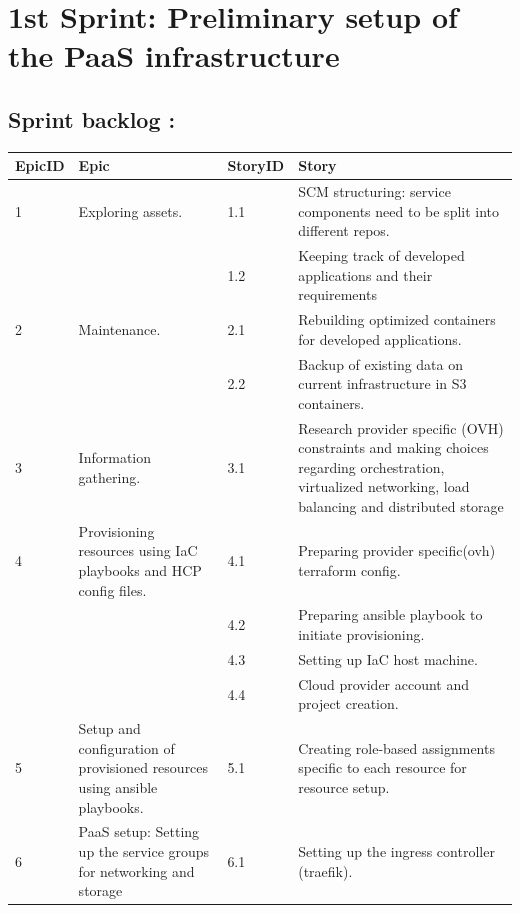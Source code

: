 \graphicspath{{./assets/}}
\setcounter{mtc}{2}
\chapter{1st Sprint: Preliminary setup of the PaaS infrastructure  }
\minitoc
\newpage

\section{Sprint backlog :}

\begin{longtable}[ht]{|m{1.5cm}|m{3cm}|m{1.5cm}|m{8cm}|}
\hline
{\textbf{EpicID}} & {\textbf{Epic}} & {\textbf{StoryID}} & {\textbf{Story}} \\
\hline
1 &  \raggedright Exploring assets.	& 1.1  & SCM structuring: service components need to be split into different repos. \\
\cline{3-4}
& & 1.2 &  	Keeping track of developed applications and their requirements \\
\hline
2  & Maintenance. &	2.1	 &  Rebuilding optimized containers for developed applications. \\
\cline{3-4}
& & 2.2 & Backup of existing data on current infrastructure in S3 containers.\\
\hline
3  & Information gathering.	 &  3.1	 &  Research provider specific (OVH) constraints and making choices regarding orchestration, virtualized networking, load balancing and distributed storage\\
\hline
4  & \raggedright Provisioning resources using IaC playbooks and HCP config files.  &  4.1	 & Preparing provider specific(ovh) terraform config. \\
\cline{3-4}
& & 4.2 & Preparing ansible playbook to initiate provisioning. \\
\cline{3-4}
& & 4.3	& Setting up IaC host machine.  \\
\cline{3-4}
& & 4.4	& Cloud provider account and project creation.  \\
\hline
5  & Setup and configuration of provisioned resources using ansible playbooks.	 &  5.1	 &  Creating role-based assignments specific to each resource for resource setup. \\
\hline
6  & PaaS setup: Setting up the service groups for networking and storage	 &  6.1	 &  Setting up the ingress controller (traefik).\\

\end{longtable}
